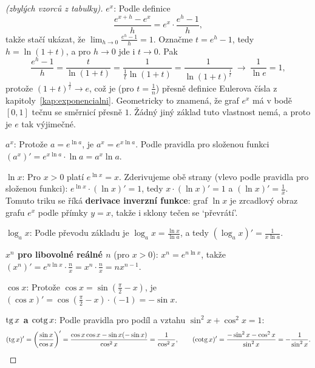 \begin{proof}[(zbylých vzorců z tabulky)]
  \textbf{$e^x$}: Podle definice
  \begin{equation*}
    \frac{e^{x + h} - e^x}{h} = e^x\cdot\frac{e^h - 1}{h},
  \end{equation*}
  takže stačí ukázat, že $\lim_{h\to 0}\frac{e^h - 1}{h} = 1$. Označme $t = e^h - 1$, tedy $h = \ln(1 + t)$, a pro $h\to 0$ jde i $t\to 0$. Pak
  \begin{equation*}
    \frac{e^h - 1}{h} = \frac{t}{\ln(1 + t)} = \frac{1}{\frac{1}{t}\ln(1 + t)} = \frac{1}{\ln{(1 + t)}^{\frac{1}{t}}}\ \longrightarrow\ \frac{1}{\ln e} = 1,
  \end{equation*}
  protože ${(1 + t)}^{\frac{1}{t}}\to e$, což je (pro $t = \frac{1}{n}$) přesně definice Eulerova čísla z kapitoly~\ref{kap:exponencialni}. Geometricky to znamená, že graf $e^x$ má v bodě $[0, 1]$ tečnu se směrnicí přesně $1$. Žádný jiný základ tuto vlastnost nemá, a proto je $e$ tak výjimečné.

  \textbf{$a^x$}: Protože $a = e^{\ln a}$, je $a^x = e^{x\ln a}$. Podle pravidla pro složenou funkci $(a^x)' = e^{x\ln a}\cdot\ln a = a^x\ln a$.

  \textbf{$\ln x$}: Pro $x > 0$ platí $e^{\ln x} = x$. Zderivujeme obě strany (vlevo podle pravidla pro složenou funkci): $e^{\ln x}\cdot(\ln x)' = 1$, tedy $x\cdot(\ln x)' = 1$ a $(\ln x)' = \frac{1}{x}$. Tomuto triku se říká \textbf{derivace inverzní funkce}: graf $\ln x$ je zrcadlový obraz grafu $e^x$ podle přímky $y = x$, takže i sklony tečen se `převrátí'.

  \textbf{$\log_a x$}: Podle převodu základu je $\log_a x = \frac{\ln x}{\ln a}$, a tedy $(\log_a x)' = \frac{1}{x\ln a}$.

  \textbf{$x^n$ pro libovolné reálné $n$} (pro $x > 0$): $x^n = e^{n\ln x}$, takže $(x^n)' = e^{n\ln x}\cdot\frac{n}{x} = x^n\cdot\frac{n}{x} = nx^{n-1}$.

  \textbf{$\cos x$}: Protože $\cos x = \sin\left(\frac{\pi}{2} - x\right)$, je $(\cos x)' = \cos\left(\frac{\pi}{2} - x\right)\cdot(-1) = -\sin x$.

  \textbf{$\operatorname{tg} x$ a $\operatorname{cotg} x$}: Podle pravidla pro podíl a vztahu $\sin^2 x + \cos^2 x = 1$:
  \begin{equation*}
    (\operatorname{tg} x)' = {\left(\frac{\sin x}{\cos x}\right)}' = \frac{\cos x\cos x - \sin x(-\sin x)}{\cos^2 x} = \frac{1}{\cos^2 x},\qquad(\operatorname{cotg} x)' = \frac{-\sin^2 x - \cos^2 x}{\sin^2 x} = -\frac{1}{\sin^2 x}.
  \end{equation*}
\end{proof}

